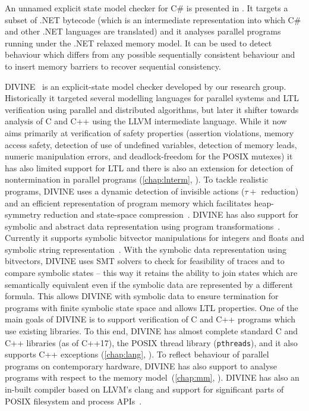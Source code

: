 An unnamed explicit state model checker for C\# is presented in .
It targets a subset of .NET bytecode (which is an intermediate representation into which C\# and other .NET languages are translated) and it analyses parallel programs running under the .NET relaxed memory model.
It can be used to detect behaviour which differs from any possible sequentially consistent behaviour and to insert memory barriers to recover sequential consistency.

DIVINE~ is an explicit-state model checker developed
by our research group.
Historically it targeted several modelling languages for parallel systems and
LTL verification using parallel and distributed algorithms, but later it
shifter towards analysis of C and C++ using the LLVM intermediate language.
While it now aims primarily at verification of safety properties (assertion
violations, memory access safety, detection of use of undefined variables,
detection of memory leads, numeric manipulation errors, and deadlock-freedom for
the POSIX mutexes) it has also limited support for LTL and there is also an
extension for detection of nontermination in parallel programs
(\autoref{chap:lnterm}, ).
To tackle realistic programs, DIVINE uses a dynamic detection of invisible
actions ($\tau+$ reduction) and an efficient representation of program memory
which facilitates heap-symmetry reduction and state-space
compression~.
DIVINE has also support for symbolic and abstract data representation using
program transformations~.
Currently it supports symbolic bitvector manipulations for integers and floats
and symbolic string representation~.
With the symbolic data representation using bitvectors, DIVINE uses SMT solvers
to check for feasibility of traces and to compare symbolic states -- this way
it retains the ability to join states which are semantically equivalent even if
the symbolic data are represented by a different formula.
This allows DIVINE with symbolic data to ensure termination for programs with
finite symbolic state space and allows LTL properties.
One of the main goals of DIVINE is to support verification of C and C++
programs which use existing libraries.
To this end, DIVINE has almost complete standard C and C++ libraries (as of
C++17), the POSIX thread library (\texttt{pthreads}), and it also supports C++
exceptions (\autoref{chap:lang}, ).
To reflect behaviour of parallel programs on contemporary hardware, DIVINE
has also support to analyse programs with respect to the \xtso memory
model~(\autoref{chap:mm}, ).
DIVINE has also an in-built compiler based on LLVM's clang and support for
significant parts of POSIX filesystem and process APIs~.

